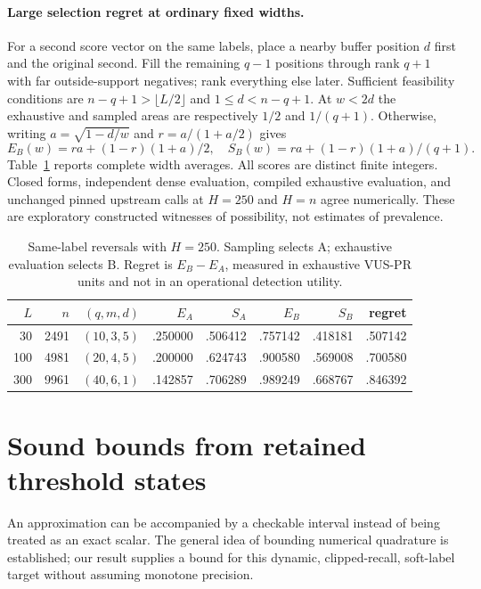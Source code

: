 \paragraph{Large selection regret at ordinary fixed widths.}
For a second score vector on the same labels, place a nearby buffer
position $d$ first and the original second. Fill the remaining $q-1$
positions through rank $q+1$ with far outside-support negatives; rank
everything else later. Sufficient feasibility conditions are
$n-q+1>\lfloor L/2\rfloor$ and $1\leq d<n-q+1$.
At $w<2d$ the exhaustive and sampled areas are respectively
$1/2$ and $1/(q+1)$. Otherwise, writing
$a=\sqrt{1-d/w}$ and $r=a/(1+a/2)$ gives
\[
 E_B(w)=ra+(1-r)(1+a)/2,\quad
 S_B(w)=ra+(1-r)(1+a)/(q+1).
\]
Table~\ref{tab:constructed-reversal} reports complete width averages.
All scores are distinct finite integers. Closed forms, independent dense
evaluation, compiled exhaustive evaluation, and unchanged pinned upstream
calls at $H=250$ and $H=n$ agree numerically. These are exploratory
constructed witnesses of possibility, not estimates of prevalence.

\begin{table}[t]
\caption{Same-label reversals with $H=250$. Sampling selects A; exhaustive
evaluation selects B. Regret is $E_B-E_A$, measured in exhaustive VUS-PR
units and not in an operational detection utility.}
\label{tab:constructed-reversal}

\centering\small
\begin{tabular}{rrrrrrrr}
\toprule
$L$ & $n$ & $(q,m,d)$ & $E_A$ & $S_A$ & $E_B$ & $S_B$ & regret\\
\midrule
30 & 2491 & $(10,3,5)$ & .250000 & .506412 & .757142 & .418181 & .507142\\
100 & 4981 & $(20,4,5)$ & .200000 & .624743 & .900580 & .569008 & .700580\\
300 & 9961 & $(40,6,1)$ & .142857 & .706289 & .989249 & .668767 & .846392\\
\bottomrule
\end{tabular}

\end{table}

\section{Sound bounds from retained threshold states}
\label{sec:threshold-certificate}
An approximation can be accompanied by a checkable interval instead of
being treated as an exact scalar. The general idea of bounding numerical
quadrature is established; our result supplies a bound for this dynamic,
clipped-recall, soft-label target without assuming monotone precision.

